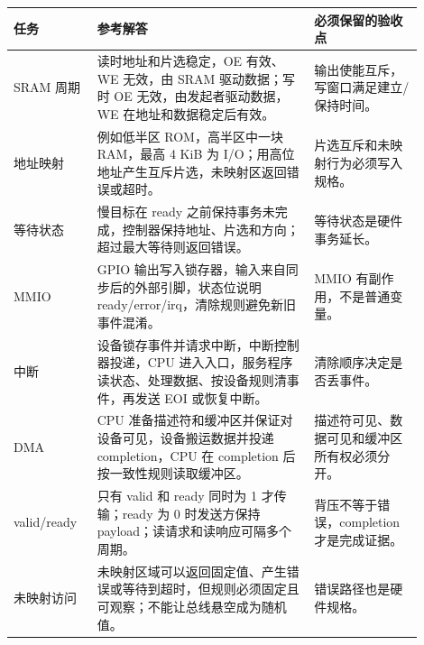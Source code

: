 \begin{longtable}{L{0.18\linewidth}L{0.48\linewidth}L{0.24\linewidth}}
\toprule
任务 & 参考解答 & 必须保留的验收点 \\
\midrule
SRAM 周期 & 读时地址和片选稳定，OE 有效、WE 无效，由 SRAM 驱动数据；写时 OE 无效，由发起者驱动数据，WE 在地址和数据稳定后有效。 & 输出使能互斥，写窗口满足建立/保持时间。 \\
地址映射 & 例如低半区 ROM，高半区中一块 RAM，最高 4 KiB 为 I/O；用高位地址产生互斥片选，未映射区返回错误或超时。 & 片选互斥和未映射行为必须写入规格。 \\
等待状态 & 慢目标在 ready 之前保持事务未完成，控制器保持地址、片选和方向；超过最大等待则返回错误。 & 等待状态是硬件事务延长。 \\
MMIO & GPIO 输出写入锁存器，输入来自同步后的外部引脚，状态位说明 ready/error/irq，清除规则避免新旧事件混淆。 & MMIO 有副作用，不是普通变量。 \\
中断 & 设备锁存事件并请求中断，中断控制器投递，CPU 进入入口，服务程序读状态、处理数据、按设备规则清事件，再发送 EOI 或恢复中断。 & 清除顺序决定是否丢事件。 \\
DMA & CPU 准备描述符和缓冲区并保证对设备可见，设备搬运数据并投递 completion，CPU 在 completion 后按一致性规则读取缓冲区。 & 描述符可见、数据可见和缓冲区所有权必须分开。 \\
valid/ready & 只有 valid 和 ready 同时为 1 才传输；ready 为 0 时发送方保持 payload；读请求和读响应可隔多个周期。 & 背压不等于错误，completion 才是完成证据。 \\
未映射访问 & 未映射区域可以返回固定值、产生错误或等待到超时，但规则必须固定且可观察；不能让总线悬空成为随机值。 & 错误路径也是硬件规格。 \\
\bottomrule
\end{longtable}
